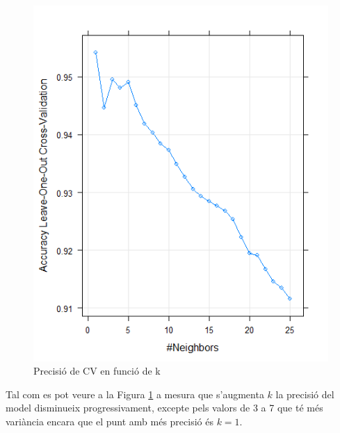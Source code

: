 \begin{figure}[H]
    \centering
    \includegraphics[height=0.8\textwidth]{img/plotmodelknn.png}
    \caption{Precisió de CV en funció de k}
    \label{fig:knnmodel}
\end{figure}
Tal com es pot veure a la Figura \ref{fig:knnmodel} a mesura que s'augmenta $k$ la precisió del model disminueix progressivament, excepte pels valors de 3 a 7 que té més variància encara que el punt amb més precisió és $k=1$.

